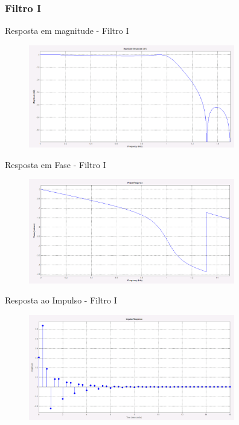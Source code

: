 \documentclass{beamer}
\begin{document}
\subsubsection{Filtro I}
	\begin{frame}{Resposta em magnitude - Filtro I}
		\begin{figure}[ht]
			\centering
			\includegraphics[width=9cm]{../pictures/Filtro1/RespMagnitudeFiltro1.png}
			\label{fig:magnitude1}
		\end{figure}
	\end{frame}
	\begin{frame}{Resposta em Fase - Filtro I}
		\begin{figure}[ht]
			\centering
			\includegraphics[width=9cm]{../pictures/Filtro1/RespFaseFiltro1.png}
			\label{fig:magnitude1}
		\end{figure}
	\end{frame}
	\begin{frame}{Resposta ao Impulso - Filtro I}
		\begin{figure}[ht]
			\centering
			\includegraphics[width=9cm]{../pictures/Filtro1/RespImpulsoFiltro1.png}
			\label{fig:magnitude1}
		\end{figure}
	\end{frame}
\end{document}
